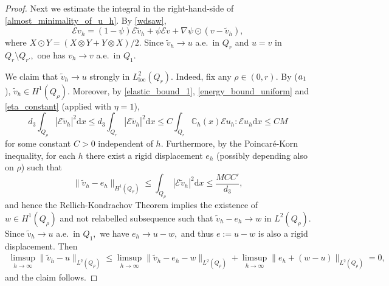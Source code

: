 \documentclass[reqno]{amsart}
\numberwithin{equation}{section}
\theoremstyle{plain}
\theoremstyle{definition}
\newcommand{\C}{\mathbb{C}}
\renewcommand{\d}{\mathrm{d}}
\renewcommand{\tilde}{\widetilde}
\newcommand{\loc}{\mathrm{loc}}
\newcommand{\str}[1]{\mathcal{E}#1}
\begin{document}
\begin{proof}
Next we estimate the integral in the right-hand-side of \eqref{almost_minimality_of_u_h}. By \eqref{wdsaw},
$$
\str{v_h}= (1-\psi)\str{\tilde v_h} + \psi \str{v} + \nabla \psi\odot (v- \tilde v_h),
$$
where $X\odot Y = (X\otimes Y +Y\otimes X)/2.$ Since $\tilde v_h\to u$ a.e.\  in $Q_r$ and $u=v$ in $Q_r\setminus Q_{r'},$ one has $v_h\to v$ a.e.\  in $Q_1.$


We claim that $\tilde v_h\to u$ strongly in $L_\loc^2(Q_r).$ Indeed, fix any $\rho\in(0,r).$ By ($\rm a_1$), $\tilde v_h\in H^1 (Q_\rho).$ Moreover, by \eqref{elastic_bound_1},  \eqref{energy_bound_uniform}  and  \eqref{eta_constant} (applied with $\eta=1$),
$$
d_3\int_{Q_\rho} |\str{\tilde v_h}|^2\d x\le d_3\int_{Q_r} |\str{\tilde v_h}|^2\d x \le C \int_{Q_r} \C_h(x) \str{u_h}:\str{u_h}\d x\le CM
$$
for some constant $C>0$ independent of $h.$  Furthermore, by the Poincar\'e-Korn inequality, for each $h$ there exist a rigid displacement $e_h$ (possibly depending also on $\rho$) such that
$$
\|\tilde v_h - e_h\|_{H^1(Q_\rho)} \le \int_{Q_\rho} |\str{\tilde v_h}|^2 \d x \le \frac{MCC'}{d_3},
$$
and hence the Rellich-Kondrachov Theorem implies the existence of $w\in H^1(Q_\rho )$ and not relabelled subsequence such that
$\tilde v_h - e_h \to w$ in $L^2(Q_\rho ).$ Since $\tilde v_h\to u$ a.e.\  in $Q_1,$ we have $e_h\to u-w,$ and thus $e:=u-w$ is also a rigid displacement. Then
$$
\begin{aligned}
\limsup\limits_{h\to\infty} \|\tilde v_h - u\|_{L^2(Q_\rho)}^{}
\le 
\limsup\limits_{h\to\infty} \|\tilde v_h -e_h - w\|_{L^2(Q_\rho)}^{} 
+
\limsup\limits_{h\to\infty} \|e_h + (w-u)\|_{L^2(Q_\rho)}^{} =0, 
\end{aligned}
$$
and the claim follows.


\end{proof}
\end{document}
